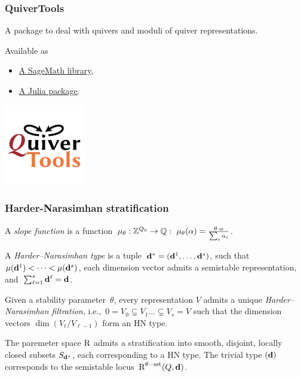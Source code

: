 \documentclass{beamer}
\begin{document}
\begin{frame}
    \frametitle{QuiverTools}
A package to deal with quivers and moduli of quiver representations. \pause

Available as

\begin{itemize}
    \item \href{quivertools.github.io/QuiverTools}{A SageMath library},
    \item \href{quivertools.github.io/QuiverTools.jl}{A Julia package}.
\end{itemize}\pause
\begin{center}
\includegraphics[width=100pt]{quivertools-logo.png}
\end{center}
\end{frame}

\begin{frame}
    \frametitle{Harder-Narasimhan stratification}
A \emph{slope function} is a function~$\mu_{\theta} : \mathbb{Z}^{Q_0} \overset{}{\rightarrow} \mathbb{Q}: ~\mu_{\theta}(\alpha) = \frac{\theta \cdot \alpha}{\sum_i \alpha_i}$. \pause
\begin{definition}

A \emph{Harder--Narasimhan type} is a
tuple~$\mathbf{d}^* = (\mathbf{d}^1,\dots,\mathbf{d}^s)$, such
that~$\mu(\mathbf{d}^1) < \dots < \mu(\mathbf{d}^s)$, each dimension
vector admits a semistable representation,
and~$\sum_{\ell = 1}^{s}\mathbf{d}^{\ell} = \mathbf{d}$. \pause

Given a stability parameter~$\theta$, every representation $V$
admits a unique \emph{Harder--Narasimhan filtration},
i.e.,~$0 = V_0 \subsetneq V_1 \dots \subsetneq V_s = V$ such that the
dimension vectors $\dim(V_{\ell}/V_{\ell-1})$ form an HN type.
\end{definition} \pause

\begin{theorem}[Reineke]
The paremeter space $\operatorname{R}$ admits a stratification into
smooth, disjoint, locally closed subsets $S_{\mathbf{d}^*}$, each corresponding
to a HN type. The trivial type $(\mathbf{d})$ corresponds to the semistable
locus~$\operatorname{R}^{\theta-\mathrm{sst}}(Q, \mathbf{d})$.
\end{theorem}

\end{frame}
\end{document}
